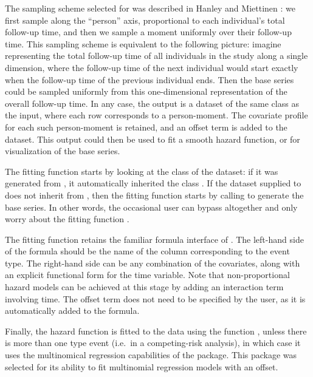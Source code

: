 \documentclass[
]{jss}
\begin{document}
The sampling scheme selected for  was described in
Hanley and Miettinen \citeyearpar{hanley2009fitting}: we first sample
along the ``person'' axis, proportional to each individual's total
follow-up time, and then we sample a moment uniformly over their
follow-up time. This sampling scheme is equivalent to the following
picture: imagine representing the total follow-up time of all
individuals in the study along a single dimension, where the follow-up
time of the next individual would start exactly when the follow-up time
of the previous individual ends. Then the base series could be sampled
uniformly from this one-dimensional representation of the overall
follow-up time. In any case, the output is a dataset of the same class
as the input, where each row corresponds to a person-moment. The
covariate profile for each such person-moment is retained, and an offset
term is added to the dataset. This output could then be used to fit a
smooth hazard function, or for visualization of the base series.

The fitting function  starts by looking at the
class of the dataset: if it was generated from , it
automatically inherited the class . If the dataset supplied
to  does not inherit from , then the
fitting function starts by calling  to generate the
base series. In other words, the occasional user can bypass
 altogether and only worry about the fitting
function .

The fitting function retains the familiar formula interface of
. The left-hand side of the formula should be the name of the
column corresponding to the event type. The right-hand side can be any
combination of the covariates, along with an explicit functional form
for the time variable. Note that non-proportional hazard models can be
achieved at this stage by adding an interaction term involving time. The
offset term does not need to be specified by the user, as it is
automatically added to the formula.

Finally, the hazard function is fitted to the data using the function
, unless there is more than one type event (i.e.~in a
competing-risk analysis), in which case it uses the multinomical
regression capabilities of the  package. This package was
selected for its ability to fit multinomial regression models with an
offset.
\end{document}
